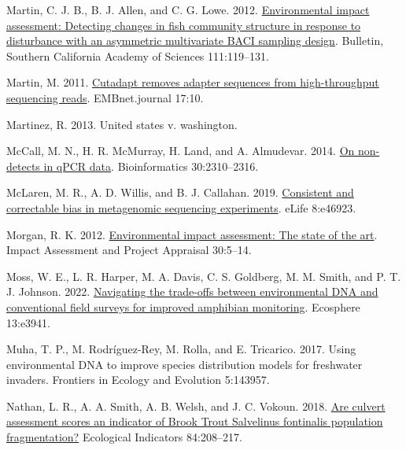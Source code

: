 \documentclass[
]{article}
\newlength{\cslhangindent}
\newlength{\cslentryspacingunit} %
\newenvironment{CSLReferences}[2] %
 {%
  \setlength{\parindent}{0pt}
  \ifodd #1
  \let\oldpar\par
  \def\par{\hangindent=\cslhangindent\oldpar}
  \fi
  \setlength{\parskip}{#2\cslentryspacingunit}
 }%
 {}
\begin{document}
\begin{CSLReferences}{1}{0}
\leavevmode{}%
Martin, C. J. B., B. J. Allen, and C. G. Lowe. 2012.
\href{https://doi.org/10.3160/0038-3872-111.2.119}{Environmental impact
assessment: Detecting changes in fish community structure in response to
disturbance with an asymmetric multivariate BACI sampling design}.
Bulletin, Southern California Academy of Sciences 111:119--131.

\leavevmode{}%
Martin, M. 2011. \href{https://doi.org/10.14806/ej.17.1.200}{Cutadapt
removes adapter sequences from high-throughput sequencing reads}.
EMBnet.journal 17:10.

\leavevmode{}%
Martinez, R. 2013. United states v. washington.

\leavevmode{}%
McCall, M. N., H. R. McMurray, H. Land, and A. Almudevar. 2014.
\href{https://doi.org/10.1093/bioinformatics/btu239}{On non-detects in
qPCR data}. Bioinformatics 30:2310--2316.

\leavevmode{}%
McLaren, M. R., A. D. Willis, and B. J. Callahan. 2019.
\href{https://doi.org/10.7554/eLife.46923}{Consistent and correctable
bias in metagenomic sequencing experiments}. eLife 8:e46923.

\leavevmode{}%
Morgan, R. K. 2012.
\href{https://doi.org/10.1080/14615517.2012.661557}{Environmental impact
assessment: The state of the art}. Impact Assessment and Project
Appraisal 30:5--14.

\leavevmode{}%
Moss, W. E., L. R. Harper, M. A. Davis, C. S. Goldberg, M. M. Smith, and
P. T. J. Johnson. 2022.
\href{https://doi.org/10.1002/ecs2.3941}{Navigating the trade-offs
between environmental DNA and conventional field surveys for improved
amphibian monitoring}. Ecosphere 13:e3941.

\leavevmode{}%
Muha, T. P., M. Rodríguez-Rey, M. Rolla, and E. Tricarico. 2017. Using
environmental DNA to improve species distribution models for freshwater
invaders. Frontiers in Ecology and Evolution 5:143957.

\leavevmode{}%
Nathan, L. R., A. A. Smith, A. B. Welsh, and J. C. Vokoun. 2018.
\href{https://doi.org/10.1016/j.ecolind.2017.08.033}{Are culvert
assessment scores an indicator of Brook Trout Salvelinus fontinalis
population fragmentation?} Ecological Indicators 84:208--217.


\end{CSLReferences}
\end{document}
